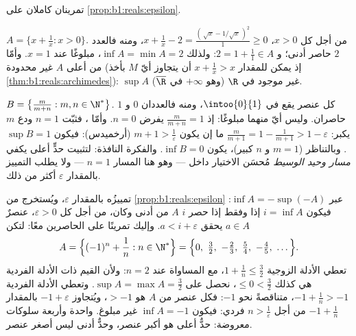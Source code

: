 \begin{example}\label{ex:b1:reals:supcompute}
تمرينان كاملان على \cref{prop:b1:reals:epsilon}.

\emph{ $A = \{x + \frac1x : x > 0\}$.} من أجل كل $x > 0$،
$x + \frac1x - 2 = \frac{(\,\sqrt x - 1/\sqrt x\,)^2}{1} \geq 0$،
ومنه فالعدد $2$ حاصر أدنى؛ و $2 = 1 + \frac11 \in A$: ولذلك
$\inf A = \min A = 2$، مبلوغًا عند $x = 1$. وأمّا من أعلى  $A$
غير محدودة (إذ يمكن للمقدار $x + \frac1x > x$ أن يتجاوز أيّ $M$ بأخذ
\cref{thm:b1:reals:archimedes}):  $\sup A$ غير موجود في $\R$
(وهو $+\infty$ في $\overline\R$).

\emph{ $B = \bigl\{\frac{m}{m + n} : m, n \in
\N^*\bigr\}$.} كل عنصر يقع في $\intoo{0}{1}$، ومنه فالعددان $0$ و
$1$ حاصران. وليس أيّ منهما مبلوغًا: إذ $\frac{m}{m+n} = 1$ يفرض
$n = 0$. وأمّا ، فثبّت $n = 1$ ودع $m$ يكبر:
$\frac{m}{m+1} = 1 - \frac{1}{m+1} > 1 - \varepsilon$ ما إن يكون
$m + 1 > \frac1\varepsilon$ (أرخميدس): فيكون $\sup B = 1$.
وبالتناظر ($m = 1$ و $n$ كبير)، يكون $\inf B = 0$. والفكرة
النافذة: لتثبيت حدٍّ أعلى يكفي \emph{مسار وحيد الوسيط}
مُحسَن الاختيار داخل  --- وهو هنا المسار $n = 1$ ---
ولا يطلب التمييز بالمقدار $\varepsilon$ أكثر من ذلك.
\end{example}

\begin{example}\label{ex:b1:reals:infmirror}
 تمييزُه بالمقدار $\varepsilon$، ويُستخرج
من \cref{prop:b1:reals:epsilon} عبر $\inf A = -\sup(-A)$:
فيكون $i = \inf A$ إذا وفقط إذا حصر $i$  $A$ من أدنى وكان، من أجل كل
$\varepsilon > 0$، عنصرٌ $a \in A$ يحقق $a < i + \varepsilon$. وإليك
تمرينًا على الحاصرين معًا: لتكن
\[
A = \Bigl\{(-1)^n + \frac1n : n \in \N^*\Bigr\}
= \Bigl\{0,\ \tfrac32,\ -\tfrac23,\ \tfrac54,\ -\tfrac45,\
\dots\Bigr\} .
\]
تعطي الأدلة الزوجية $1 + \frac1n \leq \frac32$، مع المساواة عند
$n = 2$: ولأن القيم ذات الأدلة الفردية هي كذلك $\leq 0 <
\frac32$، نحصل على $\sup A = \max A = \frac32$. وتعطي الأدلة الفردية
$-1 + \frac1n > -1$، متناقصةً نحو $-1$: فكل عنصر من
$A$ هو $> -1$، ويُتجاوز $-1 + \varepsilon$ بالمقدار $-1 +
\frac1n$ من أجل $n > \frac1\varepsilon$ فردي: فيكون $\inf A = -1$ غير
مبلوغ. \omterm{def:b1:logic:sets}{مجموعة} واحدة وأربعة سلوكات معروضة: حدٌّ أعلى
هو أكبر عنصر، وحدٌّ أدنى ليس أصغر عنصر.
\end{example}

